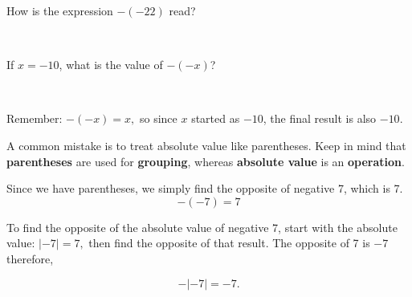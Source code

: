 \documentclass{ximera}[font=12pt]
\begin{document}
\begin{problem}
How is the expression $-(-22)$ read?

~ \\[2em]
\begin{multipleChoice}
\end{multipleChoice}

\end{problem}


\begin{problem}
If $x = -10$, what is the value of $-(-x)$?

~ \\[2em]

\begin{multipleChoice}
\end{multipleChoice}

\begin{feedback}
Remember: $-(-x) = x,$ so since $x$ started as $-10$, the final result is also $-10$.
\end{feedback}
\end{problem}


\begin{warning}
A common mistake is to treat absolute value like parentheses. Keep in mind that \textbf{parentheses} are used for \textbf{grouping}, whereas \textbf{absolute value} is an \textbf{operation}.


\begin{description}[style=nextline, leftmargin=0pt]  %
    \item[Case 1: Double Negative with Parentheses]

Since we have parentheses, we simply find the opposite of negative 7, which is 7.
\[ -(-7) = 7 \]

\item[Case 2: Double Negative with Absolute Value]

To find the opposite of the absolute value of negative 7, start with the absolute value: $|-7| = 7,$ then find the opposite of that result.  The opposite of 7 is $-7$
therefore,

\[ -|-7| = -7. \]

\end{description}

\end{warning}
\end{document}
